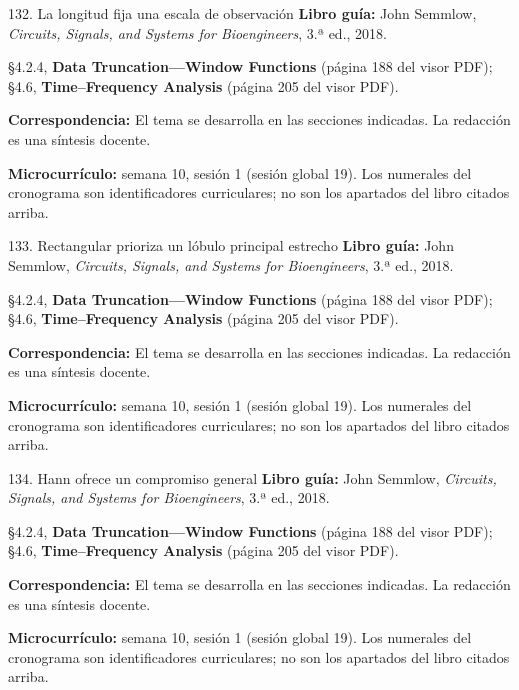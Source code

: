 \documentclass[
  10pt,
  ignorenonframetext,
  aspectratio=169,
  spanish,
]{beamer}
\begin{document}
\begin{frame}{132. La longitud fija una escala de observación}
\label{la-longitud-fija-una-escala-de-observaciuxf3n}
\textbf{Libro guía:} John Semmlow, \emph{Circuits, Signals, and Systems
for Bioengineers}, 3.ª ed., 2018.

§4.2.4, \textbf{Data Truncation---Window Functions} (página 188 del
visor PDF); §4.6, \textbf{Time--Frequency Analysis} (página 205 del
visor PDF).

\textbf{Correspondencia:} El tema se desarrolla en las secciones
indicadas. La redacción es una síntesis docente.

\textbf{Microcurrículo:} semana 10, sesión 1 (sesión global 19). Los
numerales del cronograma son identificadores curriculares; no son los
apartados del libro citados arriba.
\end{frame}

\begin{frame}{133. Rectangular prioriza un lóbulo principal estrecho}
\label{rectangular-prioriza-un-luxf3bulo-principal-estrecho}
\textbf{Libro guía:} John Semmlow, \emph{Circuits, Signals, and Systems
for Bioengineers}, 3.ª ed., 2018.

§4.2.4, \textbf{Data Truncation---Window Functions} (página 188 del
visor PDF); §4.6, \textbf{Time--Frequency Analysis} (página 205 del
visor PDF).

\textbf{Correspondencia:} El tema se desarrolla en las secciones
indicadas. La redacción es una síntesis docente.

\textbf{Microcurrículo:} semana 10, sesión 1 (sesión global 19). Los
numerales del cronograma son identificadores curriculares; no son los
apartados del libro citados arriba.
\end{frame}

\begin{frame}{134. Hann ofrece un compromiso general}
\label{hann-ofrece-un-compromiso-general}
\textbf{Libro guía:} John Semmlow, \emph{Circuits, Signals, and Systems
for Bioengineers}, 3.ª ed., 2018.

§4.2.4, \textbf{Data Truncation---Window Functions} (página 188 del
visor PDF); §4.6, \textbf{Time--Frequency Analysis} (página 205 del
visor PDF).

\textbf{Correspondencia:} El tema se desarrolla en las secciones
indicadas. La redacción es una síntesis docente.

\textbf{Microcurrículo:} semana 10, sesión 1 (sesión global 19). Los
numerales del cronograma son identificadores curriculares; no son los
apartados del libro citados arriba.
\end{frame}
\end{document}
